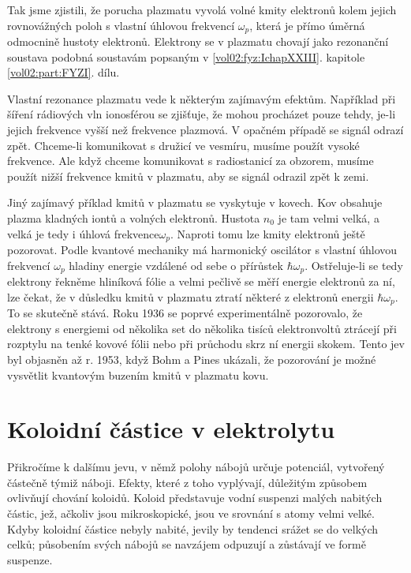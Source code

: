  Tak jsme zjistili, že porucha plazmatu vyvolá volné kmity elektronů kolem jejich rovnovážných
  poloh s vlastní úhlovou frekvencí \(ω_p\), která je přímo úměrná odmocnině hustoty elektronů.
  Elektrony se v plazmatu chovají jako rezonanční soustava podobná soustavám popsaným v
  \ref{vol02:fyz:IchapXXIII}. kapitole \ref{vol02:part:FYZI}. dílu.

  Vlastní rezonance plazmatu vede k některým zajímavým efektům. Například při šíření rádiových vln
  ionosférou se zjišťuje, že mohou procházet pouze tehdy, je-li jejich frekvence vyšší než frekvence
  plazmová. V opačném případě se signál odrazí zpět. Chceme-li komunikovat s družicí ve vesmíru,
  musíme použít vysoké frekvence. Ale když chceme komunikovat s radiostanicí za obzorem, musíme
  použít nižší frekvence kmitů v plazmatu, aby se signál odrazil zpět k zemi. 
  
  Jiný zajímavý příklad kmitů v plazmatu se vyskytuje v kovech. Kov obsahuje plazma kladných iontů a
  volných elektronů. Hustota \(n_0\) je tam velmi velká, a velká je tedy i úhlová frekvence\(ω_p\).
  Naproti tomu lze kmity elektronů ještě pozorovat. Podle kvantové mechaniky má harmonický oscilátor
  s vlastní úhlovou frekvencí \(ω_p\) hladiny energie vzdálené od sebe o přírůstek \(ℏω_p\).
  Ostřeluje-li se tedy elektrony řekněme hliníková fólie a velmi pečlivě se měří energie elektronů
  za ní, lze čekat, že v důsledku kmitů v plazmatu ztratí některé z elektronů energii \(ℏω_p\). To
  se skutečně stává. Roku 1936 se poprvé experimentálně pozorovalo, že elektrony s energiemi od
  několika set do několika tisíců elektronvoltů ztrácejí při rozptylu na tenké kovové fólii nebo při
  průchodu skrz ní energii skokem. Tento jev byl objasněn až r. 1953, když Bohm a Pines ukázali,
  že pozorování je možné vysvětlit kvantovým buzením kmitů v plazmatu kovu.

\section{Koloidní částice v elektrolytu}\label{fyz:IIchapVsecXXV}
  Přikročíme k dalšímu jevu, v němž polohy nábojů určuje potenciál, vytvořený částečně týmiž náboji.
  Efekty, které z toho vyplývají, důležitým způsobem ovlivňují chování koloidů. Koloid představuje
  vodní suspenzi malých nabitých částic, jež, ačkoliv jsou mikroskopické, jsou ve srovnání s atomy
  velmi velké. Kdyby koloidní částice nebyly nabité, jevily by tendenci srážet se do velkých celků;
  působením svých nábojů se navzájem odpuzují a zůstávají ve formě suspenze.


